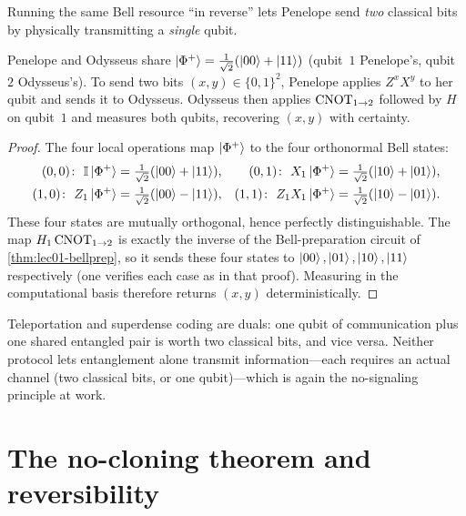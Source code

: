 Running the same Bell resource ``in reverse'' lets Penelope send \emph{two} classical
bits by physically transmitting a \emph{single} qubit.

\begin{proposition}\label{prop:lec01-superdense}
Penelope and Odysseus share $\ket{\Phi^{+}}=\tfrac{1}{\sqrt2}(\ket{00}+\ket{11})$ (qubit~$1$
Penelope's, qubit~$2$ Odysseus's). To send two bits $(x,y)\in\{0,1\}^2$, Penelope applies
$Z^{x}X^{y}$ to her qubit and sends it to Odysseus. Odysseus then applies $\mathrm{CNOT}_{1\to2}$
followed by $H$ on qubit~$1$ and measures both qubits, recovering $(x,y)$ with
certainty.
\end{proposition}

\begin{proof}
The four local operations map $\ket{\Phi^{+}}$ to the four orthonormal Bell states:
\[
  \begin{aligned}
    (0,0)\colon\ \id\ket{\Phi^{+}}&=\tfrac{1}{\sqrt2}(\ket{00}+\ket{11}),
    & (0,1)\colon\ X_1\ket{\Phi^{+}}&=\tfrac{1}{\sqrt2}(\ket{10}+\ket{01}),\\
    (1,0)\colon\ Z_1\ket{\Phi^{+}}&=\tfrac{1}{\sqrt2}(\ket{00}-\ket{11}),
    & (1,1)\colon\ Z_1X_1\ket{\Phi^{+}}&=\tfrac{1}{\sqrt2}(\ket{10}-\ket{01}).
  \end{aligned}
\]
These four states are mutually orthogonal, hence perfectly distinguishable. The map
$H_1\,\mathrm{CNOT}_{1\to2}$ is exactly the inverse of the Bell-preparation circuit of
\cref{thm:lec01-bellprep}, so it sends these four states to
$\ket{00},\ket{01},\ket{10},\ket{11}$ respectively (one verifies each case as in that
proof). Measuring in the computational basis therefore returns $(x,y)$ deterministically.
\end{proof}

\begin{remark}
Teleportation and superdense coding are duals: one qubit of communication plus one
shared entangled pair is worth two classical bits, and vice versa. Neither protocol
lets entanglement alone transmit information---each requires an actual channel (two
classical bits, or one qubit)---which is again the no-signaling principle at work.
\end{remark}

\section{The no-cloning theorem and reversibility}
\label{sec:lec01-4}

